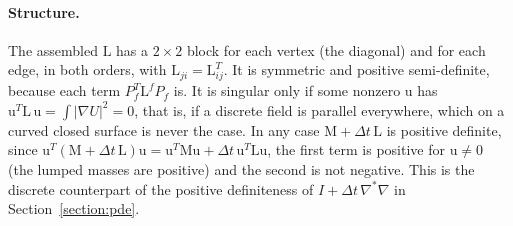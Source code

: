 \paragraph{Structure.} The assembled $\mathrm L$ has a $2 \times 2$ block for each vertex (the diagonal) and for each edge, in both orders, with $\mathrm L_{ji} = \mathrm L_{ij}^T$. It is symmetric and positive semi-definite, because each term $P_f^T\mathrm L^f P_f$ is. It is singular only if some nonzero $\mathrm u$ has $\mathrm u^T \mathrm L\, \mathrm u = \int|\nabla U|^2 = 0$, that is, if a discrete field is parallel everywhere, which on a curved closed surface is never the case. In any case $\mathrm M + \Delta t\, \mathrm L$ is positive definite, since $\mathrm u^T(\mathrm M + \Delta t\,\mathrm L)\mathrm u = \mathrm u^T\mathrm M\mathrm u + \Delta t\, \mathrm u^T\mathrm L\mathrm u$, the first term is positive for $\mathrm u \ne 0$ (the lumped masses are positive) and the second is not negative. This is the discrete counterpart of the positive definiteness of $I + \Delta t\,\nabla^*\nabla$ in Section~\ref{section:pde}.

